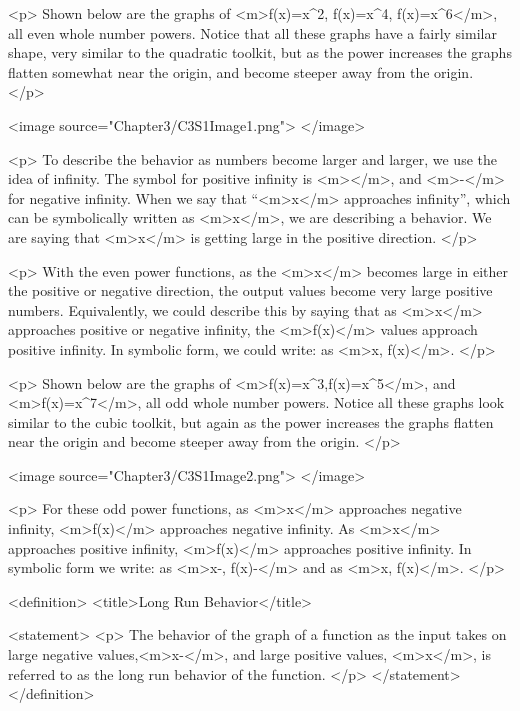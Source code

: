         <p>
            Shown below are the graphs of <m>f(x)=x^{2}, f(x)=x^{4}, f(x)=x^{6}</m>, all even whole number powers.
            Notice that all these graphs have a fairly similar shape, very similar to the quadratic toolkit, but as the power increases the graphs flatten somewhat near the origin, and become steeper away from the origin.
        </p>

        <image source="Chapter3/C3S1Image1.png">
        </image>

        <p>
            To describe the behavior as numbers become larger and larger, we use the idea of infinity.
            The symbol for positive infinity is <m>\infty</m>, and <m>-\infty</m> for negative infinity.
            When we say that “<m>x</m> approaches infinity”, which can be symbolically written as <m>x\rightarrow \infty</m>, we are describing a behavior.
            We are saying that <m>x</m> is getting large in the positive direction.
        </p>

        <p>
            With the even power functions, as the <m>x</m> becomes large in either the positive or negative direction, the output values become very large positive numbers.
            Equivalently, we could describe this by saying that as <m>x</m> approaches positive or negative infinity, the <m>f(x)</m> values approach positive infinity.
            In symbolic form, we could write: as <m>x\rightarrow \pm \infty, f(x)\rightarrow \infty</m>.
        </p>

        <p>
            Shown below are the graphs of <m>f(x)=x^{3},f(x)=x^{5}</m>, and <m>f(x)=x^{7}</m>, all odd whole number powers.
            Notice all these graphs look similar to the cubic toolkit, but again as the power increases the graphs flatten near the origin and become steeper away from the origin.
        </p>

        <image source="Chapter3/C3S1Image2.png">
        </image>

        <p>
            For these odd power functions, as <m>x</m> approaches negative infinity, <m>f(x)</m> approaches negative infinity.
            As <m>x</m> approaches positive infinity, <m>f(x)</m> approaches positive infinity.
            In symbolic form we write: as <m>x\rightarrow -\infty, f(x)\rightarrow -\infty</m> and as <m>x\rightarrow \infty, f(x)\rightarrow \infty</m>.
        </p>

        <definition>
            <title>Long Run Behavior</title>

            <statement>
                <p>
                    The behavior of the graph of a function as the input takes on large negative values,<m>x\rightarrow -\infty</m>, and large positive values, <m>x\rightarrow \infty</m>, is referred to as the long run behavior of the function.
                </p>
            </statement>
        </definition>

